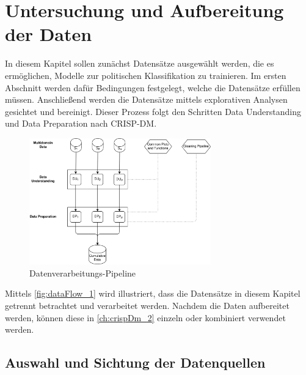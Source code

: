 
\chapter{Untersuchung und Aufbereitung der Daten} \label{ch:crispDm_1}

In diesem Kapitel sollen zunächst Datensätze ausgewählt werden, die es ermöglichen, Modelle zur politischen Klassifikation zu trainieren. Im ersten Abschnitt werden dafür Bedingungen festgelegt, welche die Datensätze erfüllen müssen. Anschließend werden die Datensätze mittels explorativen Analysen gesichtet und bereinigt. Dieser Prozess folgt den Schritten Data Understanding und Data Preparation nach \ac{CRISP-DM}.

\begin{figure}[H]
    \centering
    \includegraphics[width=0.7\textwidth]{data/images/data_flow_v2_1.png}
    \caption[Datenverarbeitungs-Pipeline]{Datenverarbeitungs-Pipeline} \label{fig:dataFlow_1}
\end{figure}

Mittels \autoref{fig:dataFlow_1} wird illustriert, dass die Datensätze in diesem Kapitel getrennt betrachtet und verarbeitet werden. Nachdem die Daten aufbereitet werden, können diese in \autoref{ch:crispDm_2} einzeln oder kombiniert verwendet werden.

\section{Auswahl und Sichtung der Datenquellen} \label{sec:dataUnderstanding}

